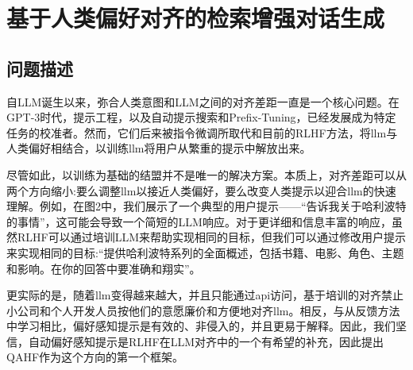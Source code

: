 \chapter{基于人类偏好对齐的检索增强对话生成}
\section{问题描述}

自LLM诞生以来，弥合人类意图和LLM之间的对齐差距一直是一个核心问题。在GPT-3\cite{DBLP:conf/nips/BrownMRSKDNSSAA20}时代，提示工程\cite{DBLP:conf/chi/ReynoldsM21}，以及自动提示搜索\cite{DBLP:conf/emnlp/ShinRLWS20}和Prefix-Tuning\cite{DBLP:journals/corr/abs-2103-10385,lester-etal-2021-power,DBLP:conf/acl/LiL20}，已经发展成为特定任务的校准者。然而，它们后来被指令微调\cite{DBLP:conf/iclr/WeiBZGYLDDL22}所取代和目前的RLHF方法\cite{DBLP:conf/nips/Ouyang0JAWMZASR22,DBLP:journals/corr/abs-2212-08073}，将llm与人类偏好相结合，以训练llm将用户从繁重的提示中解放出来。

尽管如此，以训练为基础的结盟并不是唯一的解决方案。本质上，对齐差距可以从两个方向缩小:要么调整llm以接近人类偏好，要么改变人类提示以迎合llm的快速理解。例如，在图2中，我们展示了一个典型的用户提示——“告诉我关于哈利波特的事情”，这可能会导致一个简短的LLM响应。对于更详细和信息丰富的响应，虽然RLHF可以通过培训LLM来帮助实现相同的目标，但我们可以通过修改用户提示来实现相同的目标:“提供哈利波特系列的全面概述，包括书籍、电影、角色、主题和影响。在你的回答中要准确和翔实”。

更实际的是，随着llm变得越来越大，并且只能通过api访问，基于培训的对齐禁止小公司和个人开发人员按他们的意愿廉价和方便地对齐llm。相反，与从反馈方法中学习相比，偏好感知提示是有效的、非侵入的，并且更易于解释。因此，我们坚信，自动偏好感知提示是RLHF在LLM对齐中的一个有希望的补充，因此提出QAHF作为这个方向的第一个框架。


